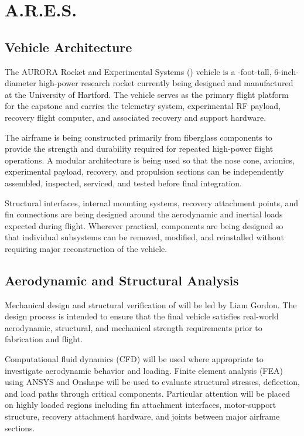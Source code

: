\section{A.R.E.S.}

\subsection{Vehicle Architecture}

The AURORA Rocket and Experimental Systems (\ares{}) vehicle is a \RHeight{}-foot-tall, 6-inch-diameter high-power research rocket currently being designed and manufactured at the University of Hartford. The vehicle serves as the primary flight platform for the capstone and carries the \deimos{} telemetry system, \phobos{} experimental RF payload, \comet{} recovery flight computer, and associated recovery and support hardware.

The airframe is being constructed primarily from fiberglass components to provide the strength and durability required for repeated high-power flight operations. A modular architecture is being used so that the nose cone, avionics, experimental payload, recovery, and propulsion sections can be independently assembled, inspected, serviced, and tested before final integration.

Structural interfaces, internal mounting systems, recovery attachment points, and fin connections are being designed around the aerodynamic and inertial loads expected during flight. Wherever practical, components are being designed so that individual subsystems can be removed, modified, and reinstalled without requiring major reconstruction of the vehicle.

\subsection{Aerodynamic and Structural Analysis}

Mechanical design and structural verification of \ares{} will be led by Liam Gordon. The design process is intended to ensure that the final vehicle satisfies real-world aerodynamic, structural, and mechanical strength requirements prior to fabrication and flight.

Computational fluid dynamics (CFD) will be used where appropriate to investigate aerodynamic behavior and loading. Finite element analysis (FEA) using ANSYS and Onshape will be used to evaluate structural stresses, deflection, and load paths through critical components. Particular attention will be placed on highly loaded regions including fin attachment interfaces, motor-support structure, recovery attachment hardware, and joints between major airframe sections.


